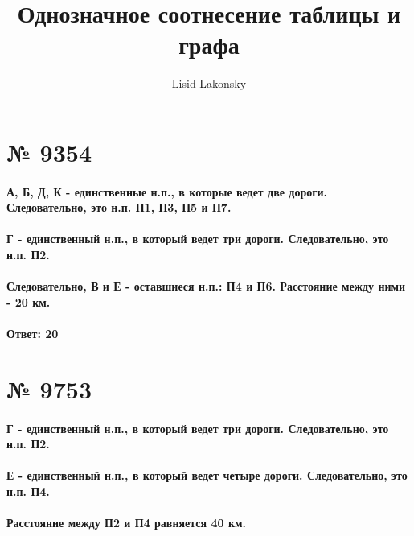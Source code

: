 \documentclass[11pt]{article} %
\title{Однозначное соотнесение таблицы и графа}
\author{Lisid Lakonsky}
\begin{document}
\maketitle

\section{№ \textbf{9354}}

\paragraph{А, Б, Д, К - единственные н.п., в которые ведет две дороги. Следовательно, это н.п. П1, П3, П5 и П7.}

\paragraph{Г - единственный н.п., в который ведет три дороги. Следовательно, это н.п. П2.}

\paragraph{Следовательно, В и Е - оставшиеся н.п.: П4 и П6. Расстояние между ними - 20 км.}

\paragraph{Ответ: \textbf{20}}

\section{№ \textbf{9753}}

\paragraph{Г - единственный н.п., в который ведет три дороги. Следовательно, это н.п. П2.}

\paragraph{Е - единственный н.п., в который ведет четыре дороги. Следовательно, это н.п. П4.}

\paragraph{Расстояние между П2 и П4 равняется 40 км.}
\end{document}
